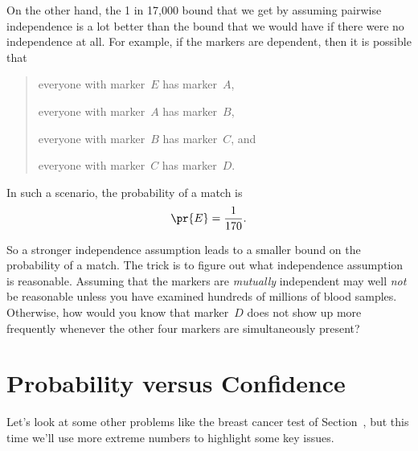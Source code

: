 On the other hand, the 1 in 17,000 bound that we get by assuming
pairwise independence is a lot better than the bound that we would
have if there were no independence at all.  For example, if the
markers are dependent, then it is possible that
\begin{quote}
everyone with marker~$E$ has marker~$A$,

everyone with marker~$A$ has marker~$B$,

everyone with marker~$B$ has marker~$C$, and

everyone with marker~$C$ has marker~$D$.
\end{quote}
In such a scenario, the probability of a match is
\begin{equation*}
    \pr{E} = \frac{1}{170}.
\end{equation*}

So a stronger independence assumption leads to a smaller bound on the
probability of a match.  The trick is to figure out what independence
assumption is reasonable.  Assuming that the markers are
\emph{mutually} independent may well \emph{not} be reasonable unless
you have examined hundreds of millions of blood samples.  Otherwise,
how would you know that marker~$D$ does not show up more frequently
whenever the other four markers are simultaneously present?

\begin{problems}
\practiceproblems
{}

\classproblems
{}

\homeworkproblems
{}

\examproblems
{}
\end{problems}


\section{Probability versus Confidence}\label{sec: Confidence_v_Prob}

\newcommand{\BF}[2]{\operatorname{Bayes-factor}(#1,#2)}
\newcommand{\testplus}{\emph{pos}}
\newcommand{\TB}{\emph{TB}}

Let's look at some other problems like the breast cancer test of
Section~, but this time we'll use more
extreme numbers to highlight some key issues.

